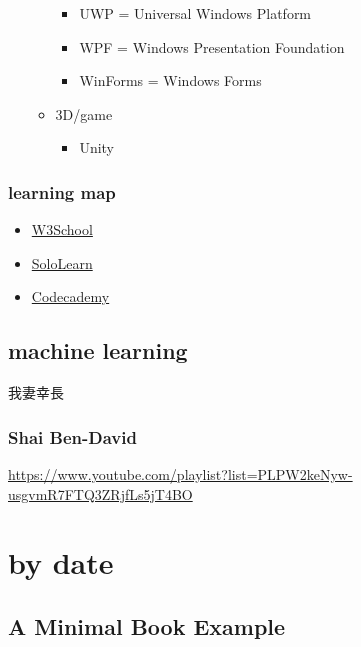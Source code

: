 \documentclass[
]{book}
\providecommand{\tightlist}{%
  \setlength{\itemsep}{0pt}\setlength{\parskip}{0pt}}
\theoremstyle{definition}
\theoremstyle{definition}
\theoremstyle{definition}
\theoremstyle{definition}
\theoremstyle{remark}
\begin{document}
\begin{itemize}
\begin{itemize}
    \begin{itemize}
    \tightlist
    \item
      UWP = Universal Windows Platform
    \item
      WPF = Windows Presentation Foundation
    \item
      WinForms = Windows Forms
    \end{itemize}
  \item
    3D/game

    \begin{itemize}
    \tightlist
    \item
      Unity
    \end{itemize}
  \end{itemize}
\end{itemize}

\section{learning map}\label{learning-map-2}

\begin{itemize}
\tightlist
\item
  \href{https://www.w3schools.com/}{W3School}
\item
  \href{https://www.sololearn.com/}{SoloLearn}
\item
  \href{https://www.codecademy.com/}{Codecademy}
\end{itemize}

\chapter{machine learning}\label{machine-learning}

\begin{CJK}{UTF8}{bsmi}
我妻幸長
\end{CJK}

\section{Shai Ben-David}\label{shai-ben-david}

\url{https://www.youtube.com/playlist?list=PLPW2keNyw-usgvmR7FTQ3ZRjfLs5jT4BO}

\part{by date}\label{part-by-date}

\chapter{A Minimal Book Example}\label{a-minimal-book-example}
\end{document}
